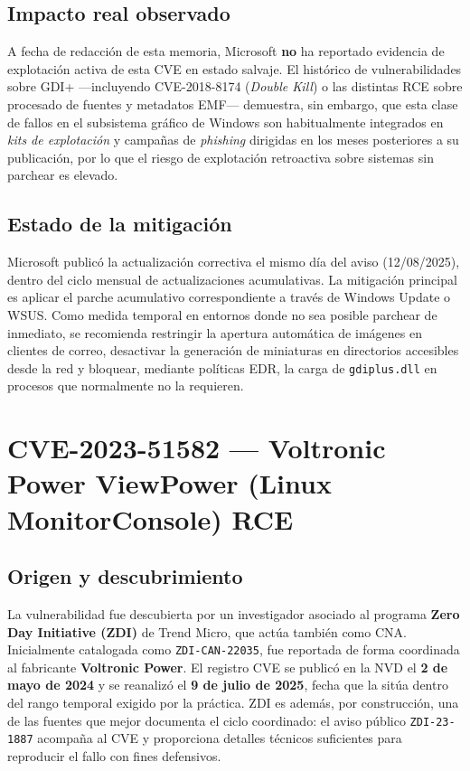 \subsection*{Impacto real observado}

A fecha de redacción de esta memoria, Microsoft \textbf{no} ha reportado evidencia de explotación activa de esta CVE en estado salvaje. El histórico de vulnerabilidades sobre GDI+ ---incluyendo CVE-2018-8174 (\textit{Double Kill}) o las distintas RCE sobre procesado de fuentes y metadatos EMF--- demuestra, sin embargo, que esta clase de fallos en el subsistema gráfico de Windows son habitualmente integrados en \textit{kits de explotación} y campañas de \textit{phishing} dirigidas en los meses posteriores a su publicación, por lo que el riesgo de explotación retroactiva sobre sistemas sin parchear es elevado.

\subsection*{Estado de la mitigación}

Microsoft publicó la actualización correctiva el mismo día del aviso (12/08/2025), dentro del ciclo mensual de actualizaciones acumulativas. La mitigación principal es aplicar el parche acumulativo correspondiente a través de Windows Update o WSUS. Como medida temporal en entornos donde no sea posible parchear de inmediato, se recomienda restringir la apertura automática de imágenes en clientes de correo, desactivar la generación de miniaturas en directorios accesibles desde la red y bloquear, mediante políticas EDR, la carga de \texttt{gdiplus.dll} en procesos que normalmente no la requieren.

\section{CVE-2023-51582 --- Voltronic Power ViewPower (Linux MonitorConsole) RCE}

\subsection*{Origen y descubrimiento}

La vulnerabilidad fue descubierta por un investigador asociado al programa \textbf{Zero Day Initiative (ZDI)} de Trend Micro, que actúa también como CNA. Inicialmente catalogada como \texttt{ZDI-CAN-22035}, fue reportada de forma coordinada al fabricante \textbf{Voltronic Power}. El registro CVE se publicó en la NVD el \textbf{2 de mayo de 2024} y se reanalizó el \textbf{9 de julio de 2025}, fecha que la sitúa dentro del rango temporal exigido por la práctica. ZDI es además, por construcción, una de las fuentes que mejor documenta el ciclo coordinado: el aviso público \texttt{ZDI-23-1887} acompaña al CVE y proporciona detalles técnicos suficientes para reproducir el fallo con fines defensivos.

